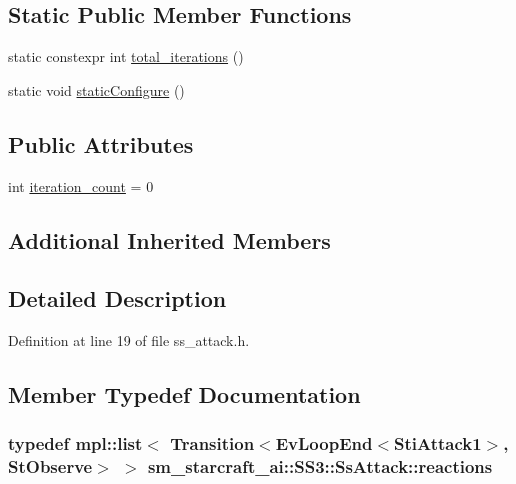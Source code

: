 \subsection*{Static Public Member Functions}
\begin{DoxyCompactItemize}
\item 
static constexpr int \hyperlink{structsm__starcraft__ai_1_1SS3_1_1SsAttack_acfe70ebd3a2b1ea73f7b2bf96ec14068}{total\+\_\+iterations} ()
\item 
static void \hyperlink{structsm__starcraft__ai_1_1SS3_1_1SsAttack_ad286529f2e2f0c40f3e74ccaf34e4376}{static\+Configure} ()
\end{DoxyCompactItemize}
\subsection*{Public Attributes}
\begin{DoxyCompactItemize}
\item 
int \hyperlink{structsm__starcraft__ai_1_1SS3_1_1SsAttack_ac3c4cbd10c7b25de8649d8b029e916f1}{iteration\+\_\+count} = 0
\end{DoxyCompactItemize}
\subsection*{Additional Inherited Members}


\subsection{Detailed Description}


Definition at line 19 of file ss\+\_\+attack.\+h.



\subsection{Member Typedef Documentation}
\subsubsection[{\texorpdfstring{reactions}{reactions}}]{\setlength{\rightskip}{0pt plus 5cm}typedef mpl\+::list$<$ Transition$<$Ev\+Loop\+End$<${\bf Sti\+Attack1}$>$, {\bf St\+Observe}$>$ $>$ {\bf sm\+\_\+starcraft\+\_\+ai\+::\+S\+S3\+::\+Ss\+Attack\+::reactions}}\hypertarget{structsm__starcraft__ai_1_1SS3_1_1SsAttack_a3b31f484f8db42bd131288e2616a1006}{}\label{structsm__starcraft__ai_1_1SS3_1_1SsAttack_a3b31f484f8db42bd131288e2616a1006}


